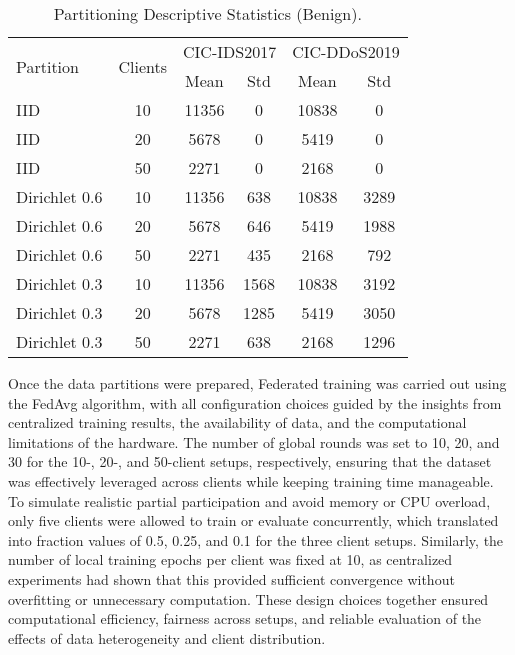 \begin{table}[h]
    \caption{Partitioning Descriptive Statistics (Benign).}
    \centering
    \begin{tabular}{l|c|c|c|c|c}
        \multirow{2}{*}{Partition} & \multirow{2}{*}{Clients} & \multicolumn{2}{|c|}{CIC-IDS2017} & \multicolumn{2}{|c}{CIC-DDoS2019} \\
        \cline{3-6} & & Mean & Std & Mean & Std \\
        \hline\hline
        IID & 10 & 11356 & 0 & 10838 & 0 \\
        IID & 20 & 5678 & 0 & 5419 & 0 \\
        IID & 50 & 2271 & 0 & 2168 & 0 \\
        Dirichlet 0.6 & 10 & 11356 & 638 & 10838 & 3289 \\
        Dirichlet 0.6 & 20 & 5678 & 646 & 5419 & 1988 \\
        Dirichlet 0.6 & 50 & 2271 & 435 & 2168 & 792 \\
        Dirichlet 0.3 & 10 & 11356 & 1568 & 10838 & 3192 \\
        Dirichlet 0.3 & 20 & 5678 & 1285 & 5419 & 3050 \\
        Dirichlet 0.3 & 50 & 2271 & 638 & 2168 & 1296 \\
    \end{tabular}
    \label{tbl:partition_descriptive}
\end{table}

Once the data partitions were prepared, Federated training was carried out using the FedAvg algorithm, with all configuration choices guided by the insights from centralized training results, the availability of data, and the computational limitations of the hardware. The number of global rounds was set to 10, 20, and 30 for the 10-, 20-, and 50-client setups, respectively, ensuring that the dataset was effectively leveraged across clients while keeping training time manageable. To simulate realistic partial participation and avoid memory or CPU overload, only five clients were allowed to train or evaluate concurrently, which translated into fraction values of 0.5, 0.25, and 0.1 for the three client setups. Similarly, the number of local training epochs per client was fixed at 10, as centralized experiments had shown that this provided sufficient convergence without overfitting or unnecessary computation. These design choices together ensured computational efficiency, fairness across setups, and reliable evaluation of the effects of data heterogeneity and client distribution.

